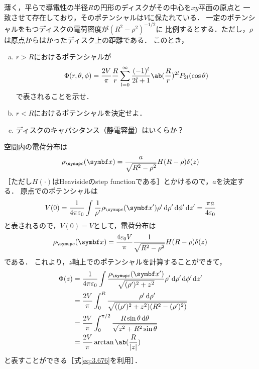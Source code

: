 \begin{bx1}
  薄く，平らで導電性の半径$R$の円形のディスクがその中心を$xy$平面の原点と
  一致させて存在しており，そのポテンシャルは$V$に保たれている．
  一定のポテンシャルをもつディスクの電荷密度が$(R^2 - \rho^2)^{-1/2}$に
  比例するとする．ただし，$\rho$は原点からはかったディスク上の距離である．
  このとき，
  \begin{enumerate}[(a)]%
    \item $r > R$におけるポテンシャルが
      \begin{gather}%
        \Phi(r, \theta, \phi) = \frac{2V}{\pi} \frac{R}{r} \sum_{l=0}^\infty \frac{(-1)^l}{2l+1} \ab(\frac R r)^{2l} P_{2l}(\cos\theta)
      \end{gather}%
      で表されることを示せ．
    \item $r < R$におけるポテンシャルを決定せよ．
    \item ディスクのキャパシタンス（静電容量）はいくらか？
  \end{enumerate}%
\end{bx1}
  空間内の電荷分布は
  \begin{gather}%
    \rho_{\mr{c}}(\bs{x}) = \frac{a}{\sqrt{R^2-\rho^2}} H(R-\rho) \delta(z)
  \end{gather}%
  ［ただし$H(\cdot)$はHeavisideのstep functionである］とかけるので，$a$を決定する．
  原点でのポテンシャルは
  \begin{gather}%
    V(0) = \frac{1}{4\pi \eps_0} \int \frac{1}{\rho'}\rho_{\mr{c}}(\bs{x'}) 
    \rho'\dl{\rho'} \dl{\phi'} \dl{z'}
    = \frac{\pi a}{4\eps_0}
  \end{gather}%
  と表されるので，$V(0) = V$として，電荷分布は
  \begin{gather}%
    \rho_{\mr{c}}(\bs{x}) = \frac{4\eps_0 V}{\pi} \frac{1}{\sqrt{R^2 - \rho^2}} 
    H(R-\rho) \delta(z)
  \end{gather}%
  である．
  これより，$z$軸上でのポテンシャルを計算することができて，
  \begin{align}%
    \Phi(z) &= \frac{1}{4\pi \eps_0} \int 
    \frac{\rho_{\mr{c}}(\bs{x'})}{\sqrt{(\rho')^2+z^2}} 
    \rho' \dl{\rho',\phi',z'}\notag\\
    &=\frac{2V}{\pi} \int_0^R \frac{\rho' \dl{\rho'}}
    {\sqrt{
      ((\rho')^2+z^2) (R^2-(\rho')^2)
    }}\notag\\
    &= \frac{2V}{\pi} \int_0^{\pi/2} 
    \frac{R\sin\theta\dl{\theta}}{\sqrt{z^2 + R^2\sin\theta}}\notag\\
    &= \frac{2V}{\pi} \arctan\ab(\frac{R}{|z|})
  \end{align}%
  と表すことができる［式\eqref{eq:3.676}を利用］．

